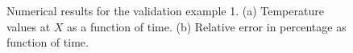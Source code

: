 
\begin{figure}
   \centering
    \caption{Numerical results for the validation example 1. (a) Temperature values at \(X\) as a function of time. (b) Relative error in percentage as function of time.}
    \label{fig:dim_example_1_comparison}
\end{figure}

